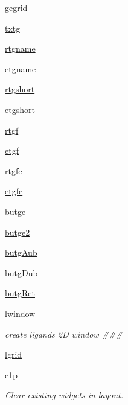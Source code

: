 \begin{DoxyCompactItemize}
\hyperlink{classmolSimplify_1_1Classes_1_1mGUI_1_1mGUI_abe0f30dada5c0337bddc1caf37d54c16}{gegrid}
\item 
\hyperlink{classmolSimplify_1_1Classes_1_1mGUI_1_1mGUI_ae6bc549a15856e1df127e16b4b1307c5}{txtg}
\item 
\hyperlink{classmolSimplify_1_1Classes_1_1mGUI_1_1mGUI_afbe02bb37401333e3c8b9cefa72932c4}{rtgname}
\item 
\hyperlink{classmolSimplify_1_1Classes_1_1mGUI_1_1mGUI_a8675b5854a4bc4085d60381450211b8b}{etgname}
\item 
\hyperlink{classmolSimplify_1_1Classes_1_1mGUI_1_1mGUI_a5711788611615cf24ac537a7cc746b8a}{rtgshort}
\item 
\hyperlink{classmolSimplify_1_1Classes_1_1mGUI_1_1mGUI_a0a85461106d825aabc4284f40fc73745}{etgshort}
\item 
\hyperlink{classmolSimplify_1_1Classes_1_1mGUI_1_1mGUI_a4b6b6767abeb831915dcdb3e7b0a364d}{rtgf}
\item 
\hyperlink{classmolSimplify_1_1Classes_1_1mGUI_1_1mGUI_aab0d884b33d92ed3ad1ad04676b43c74}{etgf}
\item 
\hyperlink{classmolSimplify_1_1Classes_1_1mGUI_1_1mGUI_a72a0eaebaba83777f9bd5199429c59e2}{rtgfc}
\item 
\hyperlink{classmolSimplify_1_1Classes_1_1mGUI_1_1mGUI_a2b965dd413de82141d4b5d7ca591ce08}{etgfc}
\item 
\hyperlink{classmolSimplify_1_1Classes_1_1mGUI_1_1mGUI_a3ca24cdd3a30fe2eadd61fce7b7ddd9c}{butge}
\item 
\hyperlink{classmolSimplify_1_1Classes_1_1mGUI_1_1mGUI_accdc47981c5142d53999d21e495913bb}{butge2}
\item 
\hyperlink{classmolSimplify_1_1Classes_1_1mGUI_1_1mGUI_afd622ccf5becf0f9eb99bb45b638237a}{butg\+Aub}
\item 
\hyperlink{classmolSimplify_1_1Classes_1_1mGUI_1_1mGUI_a41e6cc29f5645ffbeb313f37dea1d766}{butg\+Dub}
\item 
\hyperlink{classmolSimplify_1_1Classes_1_1mGUI_1_1mGUI_aa95843c3de7611edd44d070a82e3c1b6}{butg\+Ret}
\item 
\hyperlink{classmolSimplify_1_1Classes_1_1mGUI_1_1mGUI_ab31bdeeb0aa2e04ee049aeb732038936}{lwindow}
\begin{DoxyCompactList}\small\item\em create ligands 2D window \#\#\# \end{DoxyCompactList}\item 
\hyperlink{classmolSimplify_1_1Classes_1_1mGUI_1_1mGUI_acbb16feafcebf8474121701126d9dbf6}{lgrid}
\item 
\hyperlink{classmolSimplify_1_1Classes_1_1mGUI_1_1mGUI_a11f1e890927e34fb75003d94c06be63f}{c1p}
\begin{DoxyCompactList}\small\item\em Clear existing widgets in layout. \end{DoxyCompactList}\end{DoxyCompactItemize}


